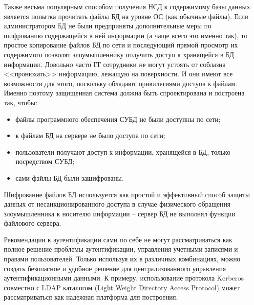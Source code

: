 Также весьма популярным способом получения НСД к содержимому базы данных
является попытка прочитать файлы БД на уровне ОС (как обычные файлы). Если
администратором БД не были предприняты дополнительные меры по шифрованию
содержащейся в ней информации (а чаще всего это именно так), то простое
копирование файлов БД по сети и последующий прямой просмотр их содержимого
позволят злоумышленнику получить доступ к хранящейся в БД информации. Довольно
часто IT сотрудники не могут устоять от соблазна <<пронюхать>> информацию,
лежащую на поверхности. И они имеют все возможности для этого, поскольку обладают
привилегиями доступа к файлам. Именно поэтому защищенная система должна быть
спроектирована и построена так, чтобы:
\begin{itemize}
  \item файлы программного обеспечения СУБД не были доступны по сети;
  \item к файлам БД на
сервере не было доступа по сети;
  \item пользователи получают доступ к информации,
хранящейся в БД, только посредством СУБД;
  \item сами файлы БД были зашифрованы.
\end{itemize}

Шифрование файлов БД используется как простой и эффективный способ защиты данных
от несанкционированного доступа в случае физического обращения злоумышленника к
носителю информации -- сервер БД не выполнял функции файлового сервера.

Рекомендации к аутентификации сами по себе не могут рассматриваться как
полное решение проблемы аутентификации, управления учетными записями и правами
пользователей. Только используя их в различных комбинациях, можно создать
безопасное и удобное решение для централизованного управления
аутентификационными данными. К примеру, использование протокола Kerberos
совместно с LDAP каталогом (Light Weight Directory Access Protocol) может
рассматриваться как надежная платформа для построения.~\cite{auth_n_aut}